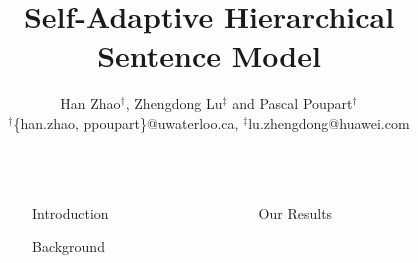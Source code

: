 \documentclass[final]{beamer}
\title{Self-Adaptive Hierarchical Sentence Model}
\author{Han Zhao$^\dagger$, Zhengdong Lu$^\ddagger$ and Pascal Poupart$^\dagger$ \\
$^\dagger$\{han.zhao, ppoupart\}@uwaterloo.ca, $^\ddagger$lu.zhengdong@huawei.com}
\institute{$^\dagger$University of Waterloo, $^\ddagger$Noah's Ark Lab, Huawei Technologies}
\newlength{\sepwid}
\newlength{\onecolwid}
\begin{document}
\begin{frame}[t] %
\vspace*{-0.4in}
\begin{columns}[t] %
\begin{column}{\sepwid}\end{column} %

\begin{column}{\onecolwid} %

\begin{block}{Introduction}\end{block}

\begin{block}{Background}\end{block}

\end{column} %

\begin{column}{\sepwid}\end{column} %

\begin{column}{\onecolwid} 
\begin{block}{Our Results}\end{block}
\end{column} 

\begin{column}{\sepwid}\end{column} %

\end{columns} %

\end{frame} %
\end{document}
